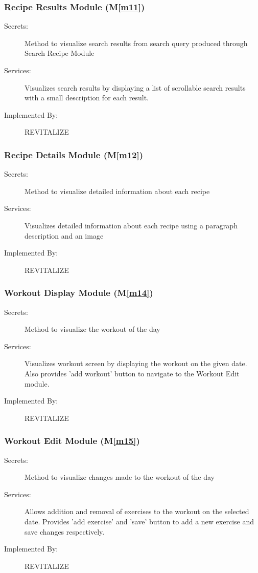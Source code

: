 \documentclass[12pt, titlepage]{article}
\newcommand{\mref}[1]{M\ref{#1}}
\begin{document}
\subsubsection{Recipe Results Module (\mref{m11})}
\begin{description}
	\item[Secrets:]Method to visualize search results from search query produced through Search Recipe Module
	\item[Services:]Visualizes search results by displaying a list of scrollable search results with a small description for each result.
	\item[Implemented By:] REVITALIZE
\end{description}

\subsubsection{Recipe Details Module (\mref{m12})}
\begin{description}
	\item[Secrets:]Method to visualize detailed information about each recipe
	\item[Services:]Visualizes detailed information about each recipe using a paragraph description and an image
	\item[Implemented By:] REVITALIZE
\end{description}

\subsubsection{Workout Display Module (\mref{m14})}
\begin{description}
	\item[Secrets:]Method to visualize the workout of the day
	\item[Services:]Visualizes workout screen by displaying the workout on the given date. Also provides 'add workout' button to navigate to the Workout Edit module.
	\item[Implemented By:] REVITALIZE
\end{description}

\subsubsection{Workout Edit Module (\mref{m15})}
\begin{description}
	\item[Secrets:]Method to visualize changes made to the workout of the day
	\item[Services:]Allows addition and removal of exercises to the workout on the selected date. Provides 'add exercise' and 'save' button to add a new exercise and save changes respectively.
	\item[Implemented By:] REVITALIZE
\end{description}
\end{document}
